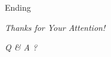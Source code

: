 \documentclass{article}
\begin{document}
\section{}

\begin{frame}
\begin{block}{Ending}
\Huge{\centerline{\emph{Thanks for Your Attention!}}}
\Huge{\centerline{\emph{Q \& A ?}}}
\end{block}

\end{frame}
\end{document}
